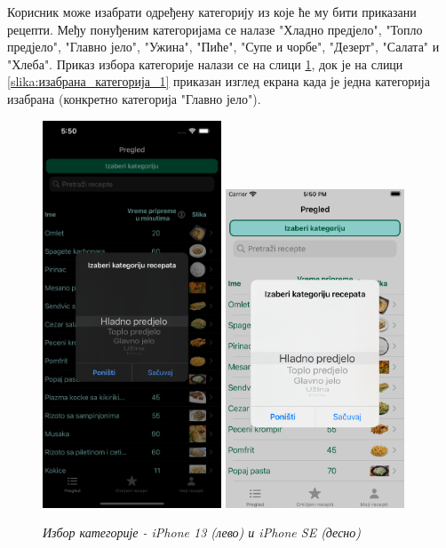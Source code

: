 \documentclass[12pt,oneside]{memoir}
\begin{document}
\indent Корисник може изабрати одређену категорију из које ће му бити приказани рецепти. Међу понуђеним категоријама се налазе "Хладно предјело", "Топло предјело", "Главно јело", "Ужина", "Пиће", "Супе и чорбе", "Дезерт", "Салата" и "Хлеба". Приказ избора категорије налази се на слици \ref{slika:категорија_1}, док је на слици \ref{slika:изабрана_категорија_1} приказан изглед екрана када је једна категорија изабрана (конкретно категорија "Главно јело").

\begin{figure} [H]
    \centering
    \captionsetup{justification=centering}
    \includegraphics[width=0.475\textwidth]{images/simulators/view images/dark - category.png} 
    \hfill
    \includegraphics[width=0.475\textwidth]{images/simulators/view images/light - category.png}
    \caption{\textit{Избор категорије - iPhone 13 (лево) и iPhone SE (десно)}}
    \label{slika:категорија_1}
\end{figure}
\end{document}
